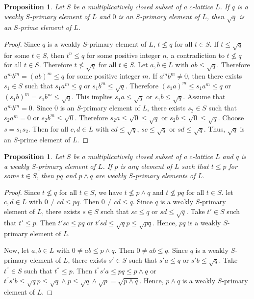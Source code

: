 \documentclass[10pt,twoside,a4paper]{amsart}
\numberwithin{equation}{section}
\theoremstyle{plain}
\newtheorem{prop}[lem]{Proposition}
\theoremstyle{definition}
\begin{document}
\begin{prop}
	Let $S$ be a multiplicatively closed subset of a $c$-lattice $L$. If $q$ is a  weakly $S$-primary element of $L$ and $0$ is an $S$-primary element of $L$, then $\sqrt{q}$ is an $S$-prime element of $L$.
\end{prop}
\begin{proof}
	Since $q$ is a  weakly $S$-primary element of $L$, $t\nleq q$ for all $t\in S$.
	If $t\leq \sqrt{q}$ for some $t\in S$, then $t^n\leq q$ for some positive integer $n$, a contradiction to $t\nleq q$ for all $t\in S$. Therefore $t\nleq \sqrt{q}$ for all $t\in S$. Let $a,b\in L$ with $ab\leq \sqrt{q}$. Therefore $a^mb^m=(ab)^m\leq q$ for some positive integer $m$. If $a^mb^m\neq 0$, then there exists $s_1\in S$ such that $s_1a^m\leq q$ or $s_1b^m\leq \sqrt{q}$. Therefore $(s_1a)^m\leq s_1a^m\leq q$ or $(s_1b)^m=s_1b^m\leq \sqrt{q}$. This implies $s_1a\leq \sqrt{q}$ or $s_1b\leq \sqrt{q}$. Assume that $a^mb^m= 0$. Since $0$ is an $S$-primary element of $L$, there exists $s_2\in S$ such that $s_2a^m= 0$ or $s_2b^m\leq \sqrt{0}$. Therefore $s_2a\leq \sqrt{0}\leq \sqrt{q}$ or $s_2b\leq \sqrt{0}\leq \sqrt{q}$. Choose $s=s_1s_2$. Then for all $c,d\in L$ with $cd\leq \sqrt{q}$, $sc\leq \sqrt{q}$ or $sd\leq \sqrt{q}$. Thus, $\sqrt{q}$ is an $S$-prime element of $L$.
\end{proof}




\begin{prop}
	Let $S$ be a multiplicatively closed subset of a $c$-lattice $L$ and $q$ is a  weakly $S$-primary element of $L$. If $p$ is any element of $L$ such that   $t\leq p$ for some $t\in S$, then $pq$ and  $p\wedge q$ are  weakly $S$-primary elements of $L$.
\end{prop}
\begin{proof} Since $t \nleq q$ for all $t \in S$, we have  $t\nleq p\wedge q$  and $t \nleq pq$ for all $t\in S$. let $c,d\in L$ with $0 \neq cd \leq p q$. Then $ 0 \neq cd\leq q$. Since $q$ is a  weakly $S$-primary element of $L$, there exists $s\in S$ such that $sc\leq q$ or $sd\leq \sqrt{q}$. Take $t'\in S$ such that $t'\leq p$. Then $t'sc\leq pq $ or $t'sd \leq \sqrt{q}p \leq  \sqrt{pq}$. Hence, $p q$ is a weakly $S$-primary element of $L$.
	
Now, let $a,b\in L$ with $0 \neq ab\leq p\wedge q$. Then $ 0 \neq ab\leq q$. Since $q$ is a  weakly $S$-primary element of $L$, there exists $s'\in S$ such that $s'a\leq q$ or $s'b\leq \sqrt{q}$. Take $t^{''}\in S$ such that $t^{''}\leq p$. Then $t^{''}s'a\leq pq \leq  p\wedge q$ or $t^{''}s'b\leq \sqrt{q}p \leq  \sqrt{q}\wedge p \leq \sqrt{q}\wedge \sqrt{p}=\sqrt{p\wedge q}$. Hence, $p\wedge q$ is a weakly $S$-primary element of $L$. 
\end{proof}
\end{document}
